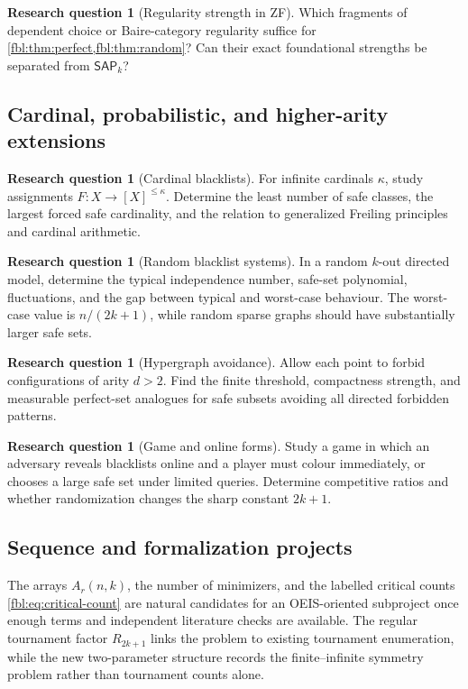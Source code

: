 \documentclass[11pt]{article}
\theoremstyle{definition}
\newtheorem{question}[theorem]{Research question}
\theoremstyle{remark}
\newcommand{\SAP}{\mathsf{SAP}}
\begin{document}
\begin{question}[Regularity strength in ZF]\label{fbl:q:regularity}
Which fragments of dependent choice or Baire-category regularity suffice for
\cref{fbl:thm:perfect,fbl:thm:random}?  Can their exact foundational strengths be
separated from $\SAP_k$?
\end{question}

\subsection{Cardinal, probabilistic, and higher-arity extensions}

\begin{question}[Cardinal blacklists]\label{fbl:q:cardinal}
For infinite cardinals $\kappa$, study assignments
$F:X\to[X]^{\le\kappa}$.  Determine the least number of safe classes, the
largest forced safe cardinality, and the relation to generalized Freiling
principles and cardinal arithmetic.
\end{question}

\begin{question}[Random blacklist systems]\label{fbl:q:random}
In a random $k$-out directed model, determine the typical independence
number, safe-set polynomial, fluctuations, and the gap between typical and
worst-case behaviour.  The worst-case value is $n/(2k+1)$, while random
sparse graphs should have substantially larger safe sets.
\end{question}

\begin{question}[Hypergraph avoidance]\label{fbl:q:hypergraph}
Allow each point to forbid configurations of arity $d>2$.  Find the finite
threshold, compactness strength, and measurable perfect-set analogues for
safe subsets avoiding all directed forbidden patterns.
\end{question}

\begin{question}[Game and online forms]\label{fbl:q:game}
Study a game in which an adversary reveals blacklists online and a player
must colour immediately, or chooses a large safe set under limited queries.
Determine competitive ratios and whether randomization changes the sharp
constant $2k+1$.
\end{question}

\subsection{Sequence and formalization projects}
The arrays $A_r(n,k)$, the number of minimizers, and the labelled critical
counts \cref{fbl:eq:critical-count} are natural candidates for an OEIS-oriented
subproject once enough terms and independent literature checks are available.
The regular tournament factor $R_{2k+1}$ links the problem to existing
tournament enumeration, while the new two-parameter structure records the
finite--infinite symmetry problem rather than tournament counts alone.
\end{document}
